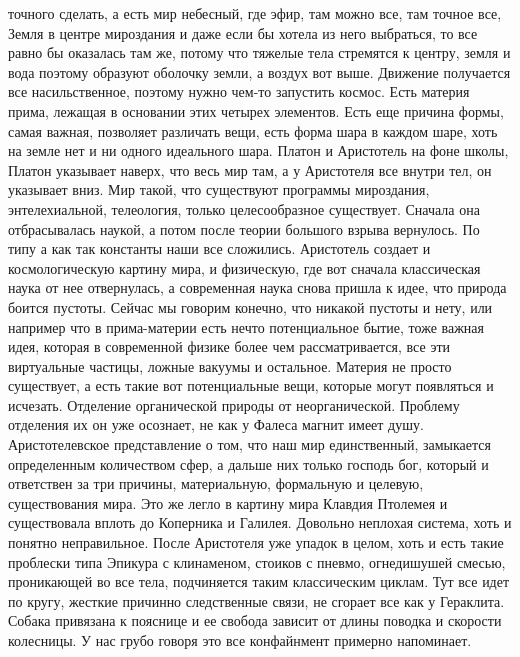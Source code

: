 \documentclass[a4paper, 12pt]{article}
\begin{document}
точного сделать, а есть мир небесный, где эфир, там можно все, там 
точное все, Земля в центре мироздания и даже если бы хотела из него 
выбраться, то все равно бы оказалась там же, потому что тяжелые тела 
стремятся к центру, земля и вода поэтому образуют оболочку земли, 
а воздух вот выше. Движение получается все насильственное, поэтому нужно 
чем-то запустить космос. Есть материя прима, лежащая в основании этих 
четырех элементов. Есть еще причина формы, самая важная, позволяет 
различать вещи, есть форма шара в каждом шаре, хоть на земле нет и ни 
одного идеального шара. Платон и Аристотель на фоне школы, Платон 
указывает наверх, что весь мир там, а у Аристотеля все внутри тел, он 
указывает вниз. Мир такой, что существуют программы мироздания, 
энтелехиальной, телеология, только целесообразное существует. Сначала 
она отбрасывалась наукой, а потом после теории большого взрыва 
вернулось. По типу а как так константы наши все сложились. Аристотель 
создает и космологическую картину мира, и физическую, где вот сначала 
классическая наука от нее отвернулась, а современная наука снова пришла 
к идее, что природа боится пустоты. Сейчас мы говорим конечно, что 
никакой пустоты и нету, или например что в прима-материи есть нечто 
потенциальное бытие, тоже важная идея, которая в современной физике 
более чем рассматривается, все эти виртуальные частицы, ложные вакуумы 
и остальное. Материя не просто существует, а есть такие вот 
потенциальные вещи, которые могут появляться и исчезать. Отделение 
органической природы от неорганической. Проблему отделения их он уже 
осознает, не как у Фалеса магнит имеет душу. Аристотелевское 
представление о том, что наш мир единственный, замыкается определенным 
количеством сфер, а дальше них только господь бог, который и ответствен 
за три причины, материальную, формальную и целевую, существования мира. 
Это же легло в картину мира Клавдия Птолемея и существовала вплоть до 
Коперника и Галилея. Довольно неплохая система, хоть и понятно 
неправильное. После Аристотеля уже упадок в целом, хоть и есть такие 
проблески типа Эпикура с клинаменом, стоиков с пневмо, огнедишушей 
смесью, проникающей во все тела, подчиняется таким классическим циклам. 
Тут все идет по кругу, жесткие причинно следственные связи, не сгорает 
все как у Гераклита. Собака привязана к пояснице и ее свобода зависит от 
длины поводка и скорости колесницы. У нас грубо говоря это все 
конфайнмент примерно напоминает. 
\end{document}

